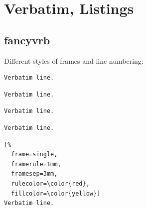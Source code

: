 \clearpage
\section{Verbatim, Listings}
\subsection{fancyvrb}

Different styles of frames and line numbering:

\begin{filecontents*}{\democodefile}
\begin{Verbatim}[fontfamily=helvetica]
Verbatim line.
\end{Verbatim}
\end{filecontents*}

%

\begin{filecontents*}{\democodefile}
\begin{Verbatim}[frame=lines]
Verbatim line.
\end{Verbatim}
\end{filecontents*}

%

\begin{filecontents*}{\democodefile}
\begin{Verbatim}[frame=single]
Verbatim line.
\end{Verbatim}
\end{filecontents*}

%

\begin{filecontents*}{\democodefile}
\begin{Verbatim}[frame=single,framesep=5mm]
Verbatim line.
\end{Verbatim}
\end{filecontents*}

%

\begin{filecontents*}{\democodefile}
\begin{Verbatim}[%
  frame=single,
  framerule=1mm,
  framesep=3mm,
  rulecolor=\color{red},
  fillcolor=\color{yellow}]
Verbatim line.
\end{Verbatim}
\end{filecontents*}

